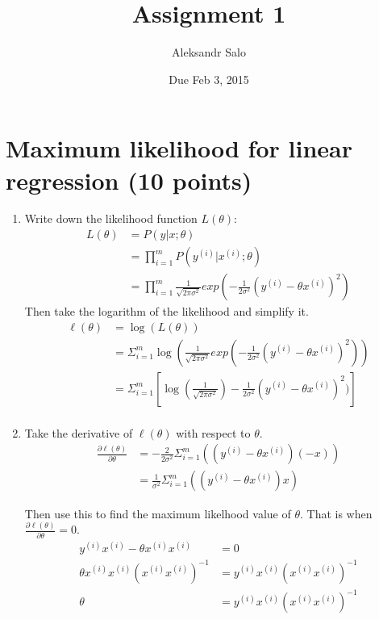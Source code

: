 \documentclass{article}
\title{Assignment 1}
\date{Due Feb 3, 2015}
\author{Aleksandr Salo}
\begin{document}
\maketitle

\section{Maximum likelihood for linear regression (10 points)}
	\begin{enumerate}
		\item  Write down the likelihood function $L(\theta)$:
		\begin{align*}
		L(\theta) &= P(y | x; \theta) \\
		&= \prod_{i=1}^{m}P(y^{(i)} | x^{(i)} ; \theta) \\
		&= \prod_{i=1}^{m} \frac{1}{\sqrt{2\pi \sigma^2}} exp(-\frac{1}{2\sigma^2} (y^{(i)} - \theta x^{(i)})^2) 
		\end{align*}
		Then take the logarithm of the likelihood and simplify it.
		\begin{align*}
		\ell(\theta) &= \log(L(\theta)) \\
		&= \Sigma_{i=1}^{m} \log(\frac{1}{\sqrt{2\pi \sigma^2}} exp(-\frac{1}{2\sigma^2} (y^{(i)} - \theta x^{(i)})^2)) \\
		&= \Sigma_{i=1}^{m} [\log(\frac{1}{\sqrt{2\pi \sigma^2}}) - \frac{1}{2\sigma^2} (y^{(i)} - \theta x^{(i)})^2)]\\
		\end{align*}
		
		\item Take the derivative of $\ell(\theta)$ with respect to $\theta$.
		\begin{align*}\frac{\partial \ell(\theta)}{\partial \theta} &= -\frac{2}{2\sigma^2} \Sigma_{i=1}^{m} ((y^{(i)} - \theta x^{(i)})  (-x)) \\
		&= \frac{1}{\sigma^2} \Sigma_{i=1}^{m} ((y^{(i)} - \theta x^{(i)})x)
		\end{align*}
		
		Then use this to find the maximum likelhood value of $\theta$. That is when $\frac{\partial \ell(\theta)}{\partial \theta} = 0$.
		\begin{align*}
		y^{(i)} x^{(i)} - \theta x^{(i)} x^{(i)} &= 0\\
		\theta x^{(i)}x^{(i)} (x^{(i)}x^{(i)})^{-1} &= y^{(i)} x^{(i)}(x^{(i)}x^{(i)})^{-1}\\
		\theta &= y^{(i)} x^{(i)}(x^{(i)}x^{(i)})^{-1}
		\end{align*}
		

\end{enumerate}
\end{document}

